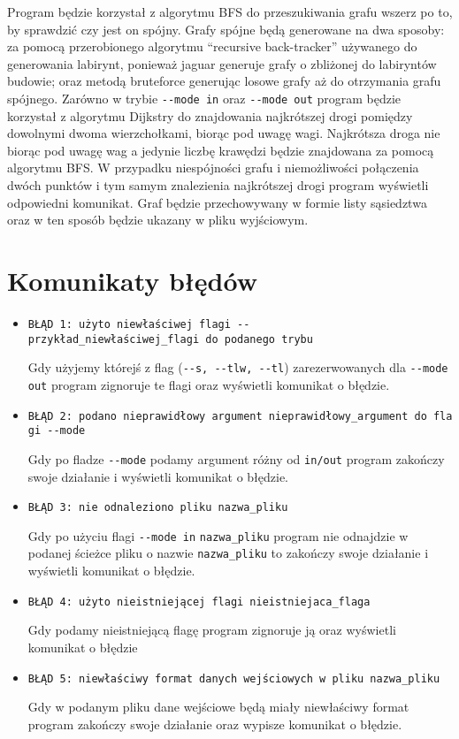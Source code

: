 \documentclass[]{article}
\begin{document}
Program będzie korzystał z algorytmu BFS do przeszukiwania grafu wszerz po to, by sprawdzić czy jest on spójny. Grafy spójne będą generowane na dwa sposoby: za pomocą przerobionego algorytmu “recursive back-tracker” używanego do generowania labirynt, ponieważ jaguar generuje grafy o zbliżonej do labiryntów budowie; oraz metodą bruteforce generując losowe grafy aż do otrzymania grafu spójnego. Zarówno w trybie \texttt{-\/-mode in} oraz \texttt{-\/-mode out} program będzie korzystał z algorytmu Dijkstry do znajdowania najkrótszej drogi pomiędzy dowolnymi dwoma wierzchołkami, biorąc pod uwagę wagi. Najkrótsza droga nie biorąc pod uwagę wag a jedynie liczbę krawędzi będzie znajdowana za pomocą algorytmu BFS. W przypadku niespójności grafu i niemożliwości połączenia dwóch punktów i tym samym znalezienia najkrótszej drogi program wyświetli odpowiedni komunikat. 
	Graf będzie przechowywany w formie listy sąsiedztwa  oraz w ten sposób będzie ukazany w pliku wyjściowym. 



\section{Komunikaty błędów}\label{header-n281}

\begin{itemize}
\item
  \texttt{BŁĄD\ 1:\ użyto\ niewłaściwej\ flagi\ -\/-przykład\_niewłaściwej\_flagi\ do\ podanego\ trybu}

  Gdy użyjemy którejś z flag (\texttt{-\/-s, -\/-tlw,  -\/-tl}) zarezerwowanych dla \texttt{-\/-mode out} program zignoruje te flagi oraz wyświetli komunikat o błędzie.
\item
  \texttt{BŁĄD\ 2:\ podano\ nieprawidłowy\ argument\ nieprawidłowy\_argument\ do\ flagi\ -\/-mode}

 Gdy po fladze \texttt{-\/-mode} podamy argument różny od \texttt{in/out} program zakończy swoje działanie i wyświetli komunikat o błędzie.
\item
\texttt{BŁĄD\ 3:\ nie\ odnaleziono\ pliku\ nazwa\_pliku}

Gdy po użyciu flagi \texttt{-\/-mode in} \verb|nazwa_pliku| program nie odnajdzie w podanej ścieżce pliku o nazwie \verb|nazwa_pliku| to zakończy swoje działanie i wyświetli komunikat o błędzie.

\item
\texttt{BŁĄD\ 4:\ użyto\ nieistniejącej\ flagi\ nieistniejaca\_flaga}

Gdy podamy nieistniejącą flagę program zignoruje ją oraz wyświetli komunikat o błędzie
\item
\texttt{BŁĄD\ 5:\ niewłaściwy\ format\ danych\ wejściowych\ w\ pliku\ nazwa\_pliku}

Gdy w podanym pliku dane wejściowe będą miały niewłaściwy format program zakończy swoje działanie oraz wypisze komunikat o błędzie.

\end{itemize}
\end{document}
